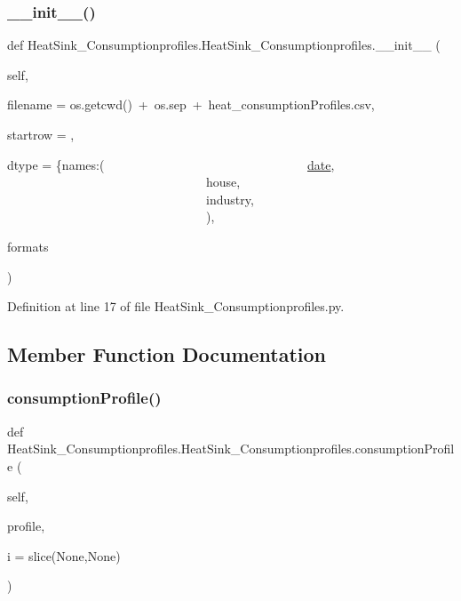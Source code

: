 \subsubsection{\texorpdfstring{\+\_\+\+\_\+init\+\_\+\+\_\+()}{\_\_init\_\_()}}
{\footnotesize\ttfamily def Heat\+Sink\+\_\+\+Consumptionprofiles.\+Heat\+Sink\+\_\+\+Consumptionprofiles.\+\_\+\+\_\+init\+\_\+\+\_\+ (\begin{DoxyParamCaption}\item[{}]{self,  }\item[{}]{filename = {\ttfamily os.getcwd()~+~os.sep~+~\textquotesingle{}heat\+\_\+consumptionProfiles.csv\textquotesingle{}},  }\item[{}]{startrow = {},  }\item[{}]{dtype = {\ttfamily \{\textquotesingle{}names\textquotesingle{}\+:(
~~~~~~~~~~~~~~~~~~~~~~~~~~~~~~~~\textquotesingle{}\hyperlink{class_heat_sink___consumptionprofiles_1_1_heat_sink___consumptionprofiles_a5e52056f8f430a2aa642948af5246a2f}{date}\textquotesingle{},
~~~~~~~~~~~~~~~~~~~~~~~~~~~~~~~~\textquotesingle{}house\textquotesingle{},
~~~~~~~~~~~~~~~~~~~~~~~~~~~~~~~~\textquotesingle{}industry\textquotesingle{},
~~~~~~~~~~~~~~~~~~~~~~~~~~~~~~~~)},  }\item[{}]{formats }\end{DoxyParamCaption})}



Definition at line 17 of file Heat\+Sink\+\_\+\+Consumptionprofiles.\+py.



\subsection{Member Function Documentation}
\mbox{\label{class_heat_sink___consumptionprofiles_1_1_heat_sink___consumptionprofiles_a62866d4ad34ff5cd3128356fd4996931}} 
\subsubsection{\texorpdfstring{consumption\+Profile()}{consumptionProfile()}}
{\footnotesize\ttfamily def Heat\+Sink\+\_\+\+Consumptionprofiles.\+Heat\+Sink\+\_\+\+Consumptionprofiles.\+consumption\+Profile (\begin{DoxyParamCaption}\item[{}]{self,  }\item[{}]{profile,  }\item[{}]{i = {\ttfamily slice(None,None)} }\end{DoxyParamCaption})}



